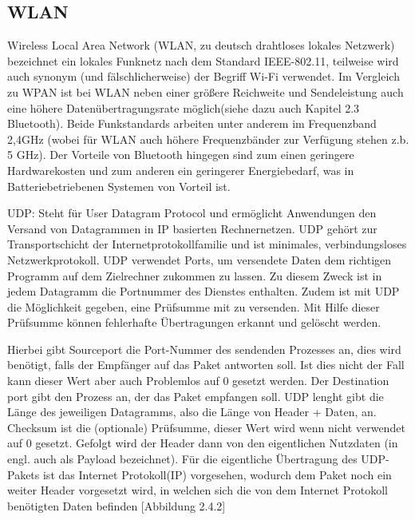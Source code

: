\subsection{WLAN} \label{grund-wlan-subsubsec}


Wireless Local Area Network (WLAN, zu deutsch drahtloses lokales Netzwerk) bezeichnet ein lokales Funknetz nach dem Standard IEEE-802.11, teilweise wird auch synonym (und fälschlicherweise) der Begriff Wi-Fi verwendet. Im Vergleich zu WPAN ist bei WLAN neben einer größere Reichweite und Sendeleistung auch eine höhere Datenübertragungsrate möglich(siehe dazu auch Kapitel 2.3 Bluetooth). Beide Funkstandards arbeiten unter anderem im Frequenzband 2,4GHz (wobei für WLAN  auch höhere Frequenzbänder zur Verfügung stehen z.b. 5 GHz). Der Vorteile von Bluetooth hingegen sind zum einen geringere Hardwarekosten und zum anderen ein geringerer Energiebedarf, was in Batteriebetriebenen Systemen von Vorteil ist.

UDP:
Steht für User Datagram Protocol  und ermöglicht Anwendungen den Versand von Datagrammen in IP basierten Rechnernetzen. UDP gehört zur Transportschicht der Internetprotokollfamilie und ist minimales, verbindungsloses Netzwerkprotokoll. UDP verwendet Ports, um versendete Daten dem richtigen Programm auf dem Zielrechner zukommen zu lassen.  Zu diesem Zweck ist in jedem Datagramm die Portnummer des Dienstes enthalten. Zudem ist mit UDP die Möglichkeit gegeben, eine Prüfsumme mit zu versenden. Mit Hilfe dieser Prüfsumme können fehlerhafte Übertragungen erkannt und gelöscht werden.


Hierbei gibt Sourceport die Port-Nummer des sendenden Prozesses an, dies wird benötigt, falls der Empfänger auf das Paket antworten soll. Ist dies nicht der Fall kann dieser Wert aber auch Problemlos auf 0 gesetzt werden. Der Destination port gibt den Prozess an, der das Paket empfangen soll. UDP lenght gibt die Länge des jeweiligen Datagramms, also die Länge von Header + Daten, an. Checksum ist die (optionale) Prüfsumme, dieser Wert wird wenn nicht verwendet auf 0 gesetzt. Gefolgt wird der Header dann von den eigentlichen Nutzdaten (in engl. auch als Payload bezeichnet). Für die eigentliche Übertragung des UDP-Pakets ist das Internet Protokoll(IP) vorgesehen, wodurch dem Paket noch ein weiter Header vorgesetzt wird,  in welchen sich die von dem Internet Protokoll benötigten Daten befinden [Abbildung 2.4.2]

